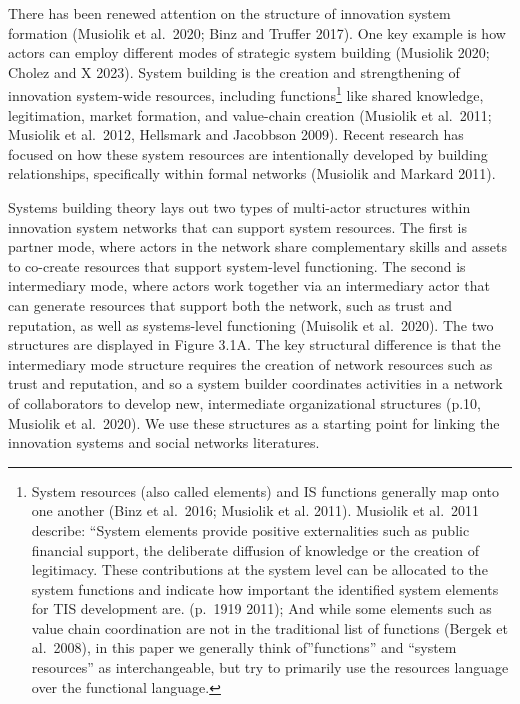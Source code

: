\documentclass[twoside,12pt,final]{ucthesis-CA2012}
\begin{document}
\begin{ucmainmatter}
There has been renewed attention on the structure of innovation system
formation (Musiolik et al.~2020; Binz and Truffer 2017). One key example
is how actors can employ different modes of \textquotesingle strategic system
building\textquotesingle{} (Musiolik 2020; Cholez and X 2023). System building is the
creation and strengthening of innovation system-wide resources,
including functions\footnote{System resources (also called \textquotesingle elements\textquotesingle) and IS functions
  generally map onto one another (Binz et al.~2016; Musiolik et al.
  2011). Musiolik et al.~2011 describe: ``System elements provide
  positive externalities such as public financial support, the
  deliberate diffusion of knowledge or the creation of legitimacy.
  These contributions at the system level can be allocated to the
  system functions and indicate how important the identified system
  elements for TIS development are.\textquotesingle{} (p.~1919 2011); And while some
  elements such as \textquotesingle value chain coordination\textquotesingle{} are not in the
  traditional list of functions (Bergek et al.~2008), in this paper we
  generally think of''functions'' and ``system resources'' as
  interchangeable, but try to primarily use the \textquotesingle resources\textquotesingle{} language
  over the \textquotesingle functional\textquotesingle{} language.} like shared knowledge, legitimation, market
formation, and value-chain creation (Musiolik et al.~2011; Musiolik et
al.~2012, Hellsmark and Jacobbson 2009). Recent research has focused on
how these system resources are intentionally developed by building
relationships, specifically within formal networks (Musiolik and Markard
2011).

Systems building theory lays out two types of multi-actor structures
within innovation system networks that can support system resources. The
first is \textquotesingle partner mode,\textquotesingle{} where actors in the network share
complementary skills and assets to co-create resources that support
system-level functioning. The second is \textquotesingle intermediary mode\textquotesingle, where
actors work together via an intermediary actor that can generate
resources that support both the network, such as trust and reputation,
as well as systems-level functioning (Muisolik et al.~2020). The two
structures are displayed in Figure 3.1A. The key structural difference
is that the intermediary mode structure requires the creation of network
resources such as trust and reputation, and so \textquotesingle a system builder
coordinates activities in a network of collaborators to develop new,
intermediate organizational structures\textquotesingle{} (p.10, Musiolik et al.~2020).
We use these structures as a starting point for linking the innovation
systems and social networks literatures.


\end{ucmainmatter}
\end{document}
